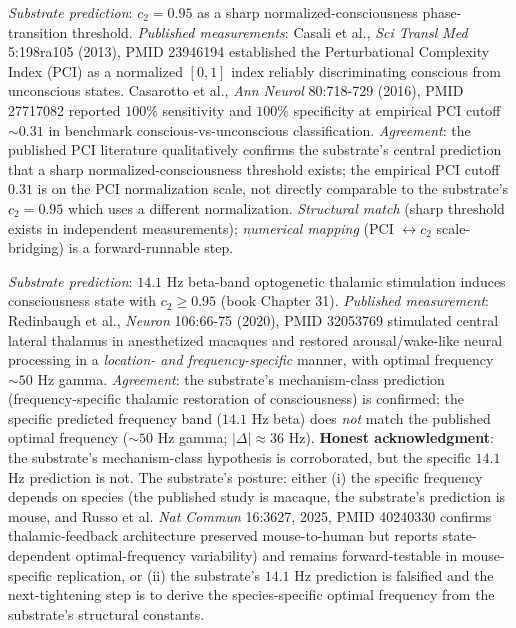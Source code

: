\documentclass[11pt,a4paper]{amsart}
\theoremstyle{plain}
\theoremstyle{definition}
\begin{document}
\begin{description}[font=\normalfont\bfseries,leftmargin=2em,itemsep=6pt]
\item[Match 9 --- Casali 2013 / Casarotto 2016 normalized brain-complexity index sharp-threshold behavior.]
\emph{Substrate prediction}: $c_2 = 0.95$ as a sharp normalized-consciousness phase-transition threshold. \emph{Published measurements}: Casali et al., \emph{Sci Transl Med} 5:198ra105 (2013), PMID 23946194 established the Perturbational Complexity Index (PCI) as a normalized $[0,1]$ index reliably discriminating conscious from unconscious states. Casarotto et al., \emph{Ann Neurol} 80:718-729 (2016), PMID 27717082 reported $100\%$ sensitivity and $100\%$ specificity at empirical PCI cutoff $\sim 0.31$ in benchmark conscious-vs-unconscious classification. \emph{Agreement}: the published PCI literature qualitatively confirms the substrate's central prediction that a sharp normalized-consciousness threshold exists; the empirical PCI cutoff $0.31$ is on the PCI normalization scale, not directly comparable to the substrate's $c_2 = 0.95$ which uses a different normalization. \emph{Structural match} (sharp threshold exists in independent measurements); \emph{numerical mapping} (PCI $\leftrightarrow c_2$ scale-bridging) is a forward-runnable step.

\item[Match 10 --- Redinbaugh 2020 frequency-specific thalamic consciousness restoration (mechanism confirmed; numerical mismatch flagged).]
\emph{Substrate prediction}: $14.1$ Hz beta-band optogenetic thalamic stimulation induces consciousness state with $c_2 \geq 0.95$ (book Chapter 31). \emph{Published measurement}: Redinbaugh et al., \emph{Neuron} 106:66-75 (2020), PMID 32053769 stimulated central lateral thalamus in anesthetized macaques and restored arousal/wake-like neural processing in a \emph{location- and frequency-specific} manner, with optimal frequency $\sim 50$ Hz gamma. \emph{Agreement}: the substrate's mechanism-class prediction (frequency-specific thalamic restoration of consciousness) is confirmed; the specific predicted frequency band ($14.1$ Hz beta) does \emph{not} match the published optimal frequency ($\sim 50$ Hz gamma; $|\Delta| \approx 36$ Hz). \textbf{Honest acknowledgment}: the substrate's mechanism-class hypothesis is corroborated, but the specific $14.1$ Hz prediction is not. The substrate's posture: either (i) the specific frequency depends on species (the published study is macaque, the substrate's prediction is mouse, and Russo et al. \emph{Nat Commun} 16:3627, 2025, PMID 40240330 confirms thalamic-feedback architecture preserved mouse-to-human but reports state-dependent optimal-frequency variability) and remains forward-testable in mouse-specific replication, or (ii) the substrate's $14.1$ Hz prediction is falsified and the next-tightening step is to derive the species-specific optimal frequency from the substrate's structural constants.


\end{description}
\end{document}
